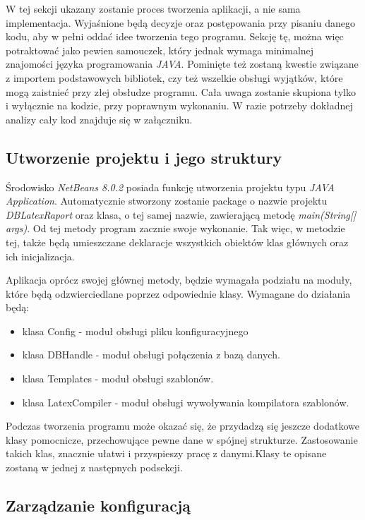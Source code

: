 W tej sekcji ukazany zostanie proces tworzenia aplikacji, a nie sama implementacja. Wyjaśnione będą decyzje oraz postępowania przy pisaniu danego kodu, aby w pełni oddać idee tworzenia tego programu. Sekcję tę, można więc potraktować jako pewien samouczek, który jednak wymaga minimalnej znajomości języka programowania \emph{JAVA}. Pominięte też zostaną kwestie związane z importem podstawowych bibliotek, czy też wszelkie obsługi wyjątków, które mogą zaistnieć przy złej obsłudze programu. Cała uwaga zostanie skupiona tylko i wyłącznie na kodzie, przy poprawnym wykonaniu. W razie potrzeby dokładnej analizy cały kod znajduje się w załączniku.

\subsection{Utworzenie projektu i jego struktury}

Środowisko \emph{NetBeans 8.0.2} posiada funkcję utworzenia projektu typu \emph{JAVA Application}. Automatycznie stworzony zostanie package o nazwie projektu \emph{DBLatexRaport} oraz klasa, o tej samej nazwie, zawierającą metodę \emph{main(String[] args)}. Od tej metody program zacznie swoje wykonanie. Tak więc, w metodzie tej, także będą umieszczane deklaracje wszystkich obiektów klas głównych oraz ich inicjalizacja. 
\par 
Aplikacja oprócz swojej głównej metody, będzie wymagała podziału na moduły, które będą odzwierciedlane poprzez odpowiednie klasy. Wymagane do działania będą:
\begin{itemize}
\item klasa Config - moduł obsługi pliku konfiguracyjnego 
\item klasa DBHandle - moduł obsługi połączenia z bazą danych.
\item klasa Templates - moduł obsługi szablonów.
\item klasa LatexCompiler -  moduł obsługi wywoływania kompilatora szablonów.
\end{itemize}
\vspace{5mm}
Podczas tworzenia programu może okazać się, że przydadzą się jeszcze dodatkowe klasy pomocnicze, przechowujące pewne dane w spójnej strukturze. Zastosowanie takich klas, znacznie ułatwi i przyspieszy pracę z danymi.Klasy te opisane zostaną w jednej z następnych podsekcji.

\subsection{Zarządzanie konfiguracją}

